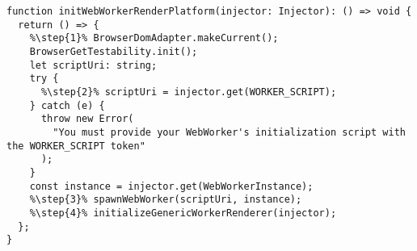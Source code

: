 \begin{verbatim}
function initWebWorkerRenderPlatform(injector: Injector): () => void {
  return () => {
    %\step{1}% BrowserDomAdapter.makeCurrent();
    BrowserGetTestability.init();
    let scriptUri: string;
    try {
      %\step{2}% scriptUri = injector.get(WORKER_SCRIPT);
    } catch (e) {
      throw new Error(
        "You must provide your WebWorker's initialization script with the WORKER_SCRIPT token"
      );
    }
    const instance = injector.get(WebWorkerInstance);
    %\step{3}% spawnWebWorker(scriptUri, instance);
    %\step{4}% initializeGenericWorkerRenderer(injector);
  };
}
\end{verbatim}
